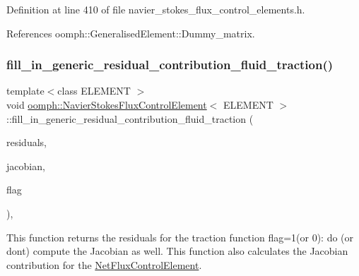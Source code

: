 Definition at line 410 of file navier\+\_\+stokes\+\_\+flux\+\_\+control\+\_\+elements.\+h.



References oomph\+::\+Generalised\+Element\+::\+Dummy\+\_\+matrix.

\mbox{\label{classoomph_1_1NavierStokesFluxControlElement_a61f129d70845f43c8cb592a4f1258a9f}} 
\subsubsection{\texorpdfstring{fill\+\_\+in\+\_\+generic\+\_\+residual\+\_\+contribution\+\_\+fluid\+\_\+traction()}{fill\_in\_generic\_residual\_contribution\_fluid\_traction()}}
{\footnotesize\ttfamily template$<$class E\+L\+E\+M\+E\+NT $>$ \\
void \hyperlink{classoomph_1_1NavierStokesFluxControlElement}{oomph\+::\+Navier\+Stokes\+Flux\+Control\+Element}$<$ E\+L\+E\+M\+E\+NT $>$\+::fill\+\_\+in\+\_\+generic\+\_\+residual\+\_\+contribution\+\_\+fluid\+\_\+traction (\begin{DoxyParamCaption}\item[{\hyperlink{classoomph_1_1Vector}{Vector}$<$ double $>$ \&}]{residuals,  }\item[{\hyperlink{classoomph_1_1DenseMatrix}{Dense\+Matrix}$<$ double $>$ \&}]{jacobian,  }\item[{unsigned}]{flag }\end{DoxyParamCaption})\hspace{0.3cm}{\ttfamily [inline]}, {\ttfamily [protected]}}



This function returns the residuals for the traction function flag=1(or 0)\+: do (or don\textquotesingle{}t) compute the Jacobian as well. This function also calculates the Jacobian contribution for the \hyperlink{classoomph_1_1NetFluxControlElement}{Net\+Flux\+Control\+Element}. 



